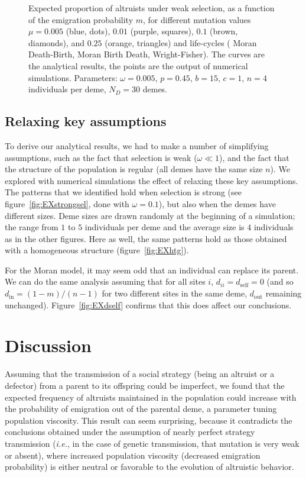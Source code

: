 \documentclass[11pt, letterpaper]{article}
\newcommand{\ie}{\textit{i.e.}}
\newcommand{\din}{d_{\textrm{in}}}
\newcommand{\dself}{d_{\textrm{self}}}
\newcommand{\dout}{d_{\textrm{out}}}
\newcommand{\ndemes}{N_D}
\begin{document}
\begin{figure}
\begin{tabular}{ccc}
\end{tabular}
\caption{Expected proportion of altruists under weak selection, as a function of the emigration probability $m$, for different mutation values $\mu = 0.005$ (blue, dots), $0.01$ (purple, squares), $0.1$ (brown, diamonds), and $0.25$ (orange, triangles) and life-cycles ( Moran Death-Birth,  Moran Birth Death,  Wright-Fisher). The curves are the analytical results, the points are the output of numerical simulations. 
Parameters: $\omega = 0.005$, $p=0.45$, $b = 15$, $c = 1$, $n=4$ individuals per deme, $\ndemes=30$ demes.}
\label{fig:EX}
\end{figure}

\subsection{Relaxing key assumptions}

To derive our analytical results, we had to make a number of simplifying assumptions, such as the fact that selection is weak ($\omega \ll 1$), and the fact that the structure of the population is regular (all demes have the same size $n$). We explored with numerical simulations the effect of relaxing these key assumptions. The patterns that we identified hold when selection is strong (see figure~\ref{fig:EXstrongsel}, done with $\omega = 0.1$), but also when the demes have different sizes. Deme sizes are drawn randomly at the beginning of a simulation; the range from $1$ to $5$ individuals per deme and the average size is $4$ individuals as in the other figures. Here as well, the same patterns hold as those obtained with a homogeneous structure (figure~\ref{fig:EXhtg}). 

For the Moran model, it may seem odd that an individual can replace its parent. We can do the same analysis assuming that for all sites $i$, $d_{ii}=\dself=0$ (and so $\din = (1-m)/(n-1)$ for two different sites in the same deme, $\dout$ remaining unchanged). Figure~\ref{fig:EXdself} confirms that this does affect our conclusions. 

\section{Discussion}
Assuming that the transmission of a social strategy (being an altruist or a defector) from a parent to its offspring could be imperfect, we found that the expected frequency of altruists maintained in the population could increase with the probability of emigration out of the parental deme, a parameter tuning population viscosity. This result can seem surprising, because it contradicts the conclusions obtained under the assumption of nearly perfect strategy transmission (\ie, in the case of genetic transmission, that mutation is very weak or absent), where increased population viscosity (decreased emigration probability) is either neutral \citep{Taylor1992islandmodel} or favorable \citep{TaylorDayWild2007} to the evolution of altruistic behavior. 
\end{document}
